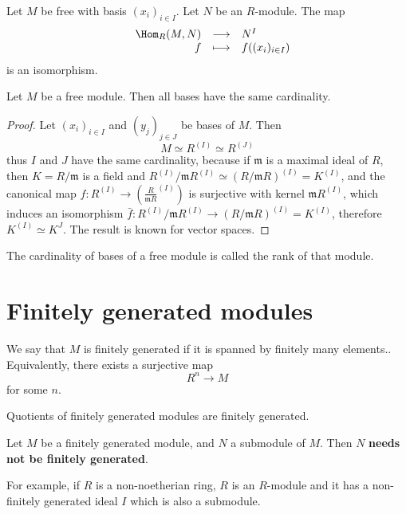 \begin{cor}
Let $M$ be free with basis  $(x_i)_{i \in  I}$. Let $N$ be an  $R$-module. The map  \[
\begin{array}{rrcl}
    & \Hom_R(M,N) & \longrightarrow & N^I \\
    & f & \longmapsto & \displaystyle f((x_i)_{i \in  I})
\end{array}
\]
is an isomorphism.
\end{cor}

\begin{thm}
Let $ M$ be a free module. Then all bases have the same cardinality.
\end{thm}

\begin{proof}
Let $(x_i)_{i \in  I}$ and $(y_j)_{j \in  J}$ be bases of $M$. Then \[
M \simeq R^{(I)}\simeq R^{(J)}
\]
thus $I$ and $J$ have the same cardinality, because if $\mathfrak m$ is a maximal ideal of $R$, then $K={R} / {\mathfrak m}$ is a field and $R^{(I)}/\mathfrak mR^{(I)}\simeq (R / \mathfrak m R)^{(I)}=K^{(I)}$, and the canonical map $f: R^{(I)} \longrightarrow  (\frac{R}{\mathfrak mR}^{(I)})$ is surjective with kernel $\mathfrak mR^{(I)}$, which induces an isomorphism $\bar f : R^{(I)} / \mathfrak mR^{(I)} \longrightarrow  (R /\mathfrak mR)^{(I)}=K^{(I)}$, therefore $K^{(I)}\simeq K^{J}$. The result is known for vector spaces.
\end{proof}

\begin{dfn}
    The cardinality of bases of a free module is called the rank of that module.
\end{dfn}

\section{Finitely generated modules}

\begin{dfn}
    We say that $M$ is finitely generated if it is spanned by finitely many elements..
    Equivalently, there exists a surjective map \[
        R^n  \longrightarrow  M 
    \]
    for some $n$.
\end{dfn}

\begin{cor}
Quotients of finitely generated modules are finitely generated.
\end{cor}

\begin{rem}
    Let $M$ be a finitely generated module, and $N$ a submodule of $M$. Then $N$ \textbf{needs not be finitely generated}.

    For example, if $R$ is a non-noetherian ring, $R$ is an  $R$-module and it has a non-finitely generated ideal  $I$ which is also a  submodule.
\end{rem}

